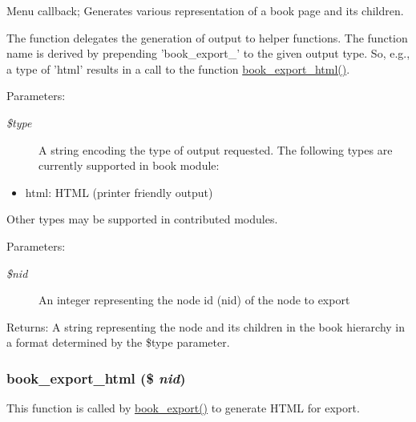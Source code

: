 Menu callback; Generates various representation of a book page and its children.

The function delegates the generation of output to helper functions. The function name is derived by prepending 'book\_\-export\_\-' to the given output type. So, e.g., a type of 'html' results in a call to the function \hyperlink{book_8pages_8inc_9916aa7ebfa4de8b221ba9e33592bb69}{book\_\-export\_\-html()}.

\begin{Desc}
\item[Parameters:]
\begin{description}
\item[{\em \$type}]A string encoding the type of output requested. The following types are currently supported in book module:\end{description}
\end{Desc}
\begin{itemize}
\item html: HTML (printer friendly output)\end{itemize}


Other types may be supported in contributed modules. \begin{Desc}
\item[Parameters:]
\begin{description}
\item[{\em \$nid}]An integer representing the node id (nid) of the node to export \end{description}
\end{Desc}
\begin{Desc}
\item[Returns:]A string representing the node and its children in the book hierarchy in a format determined by the \$type parameter. \end{Desc}
\hypertarget{book_8pages_8inc_9916aa7ebfa4de8b221ba9e33592bb69}{
\subsubsection[{book\_\-export\_\-html}]{\setlength{\rightskip}{0pt plus 5cm}book\_\-export\_\-html (\$ {\em nid})}}
\label{book_8pages_8inc_9916aa7ebfa4de8b221ba9e33592bb69}


This function is called by \hyperlink{book_8pages_8inc_dcfa1ae54cd2673dfedbae459ea573de}{book\_\-export()} to generate HTML for export.

